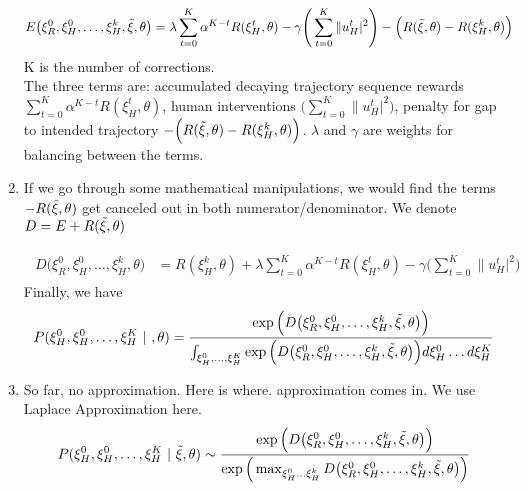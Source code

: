 \begin{enumerate}
\begin{eqnarray}
\begin{aligned}
E\big(\xi_R^0,\xi_H^0, \ldots, \xi_H^{k}, \Tilde{\xi}, \theta\big) &=   \lambda \sum_{t = 0}^{K} \alpha ^{K-t}R(\xi_H^t, \theta) - \gamma \Bigg(\sum_{t = 0}^K\|u_H^t|^2\Bigg) - \Big(R(\Tilde{\xi}, \theta) - R(\xi_H^k, \theta)\Big) 
\end{aligned}
\label{eq:correction_cost}
\end{eqnarray}
K is the number of corrections.\\
The three terms are: accumulated decaying trajectory sequence rewards $\sum_{t = 0}^{K} \alpha ^{K-t}R(\xi_H^t, \theta)$, human interventions $\Bigg(\sum_{t = 0}^K\|u_H^t|^2\Bigg)$, penalty for gap to intended trajectory $- \Big(R(\Tilde{\xi}, \theta) - R(\xi_H^k, \theta)\Big)$. $\lambda$ and $\gamma$ are weights for balancing between the terms.\\

\item If we go through some mathematical manipulations, we would find the terms $- R(\Tilde{\xi}, \theta)$ get canceled out in both numerator/denominator. We denote $D = E + R(\Tilde{\xi}, \theta)$

\begin{eqnarray}
\begin{aligned}
D\big(\xi_R^0,\xi_H^0, \ldots, \xi_H^{k},  \theta\big) &=   R(\xi_H^k, \theta) + \lambda \sum_{t = 0}^{K} \alpha ^{K-t}R(\xi_H^t, \theta) - \gamma \Bigg(\sum_{t = 0}^K\|u_H^t|^2\Bigg) 
\end{aligned}
\label{eq:correction_cost}
\end{eqnarray}
Finally, we have
\begin{equation}
    P(\xi_H^0, \xi_H^0, \ldots, \xi_H^{K} ~|~ , \theta) = \frac{\exp\Big(D\big(\xi_R^0,\xi_H^0, \ldots, \xi_H^{k}, \Tilde{\xi}, \theta\big)\Big)}{\int_{ \xi_H^0, \ldots, \xi_H^{K}}\exp\Big(D\big(\xi_R^0,\xi_H^0, \ldots, \xi_H^{k}, \Tilde{\xi}, \theta\big)\Big)d\xi_H^0 \ldots d\xi_H^{K}}
\end{equation}

\item So far, no approximation. Here is where. approximation comes in. We use Laplace Approximation here.
\begin{equation}
     P(\xi_H^0, \xi_H^0, \ldots, \xi_H^{K} ~|~ \Tilde{\xi}, \theta) \sim \frac{\exp\Big(D\big(\xi_R^0,\xi_H^0, \ldots, \xi_H^{k}, \Tilde{\xi}, \theta\big)\Big)}{\exp\Big(\max_{\xi_H^0 \ldots \xi_H^k} D\big(\xi_R^0,\xi_H^0, \ldots, \xi_H^{k}, \Tilde{\xi}, \theta\big)\Big)}
\label{eq:seq_prob}
\end{equation}
\end{enumerate}

\clearpage

